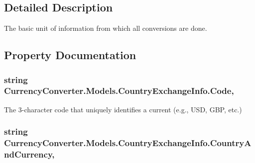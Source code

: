 \subsection{Detailed Description}
The basic unit of information from which all conversions are done. 



\subsection{Property Documentation}
\hypertarget{class_currency_converter_1_1_models_1_1_country_exchange_info_a07914fa16f09bfb0343b9008e96a7d33}{
\subsubsection[{Code}]{\setlength{\rightskip}{0pt plus 5cm}string Currency\-Converter.\-Models.\-Country\-Exchange\-Info.\-Code\hspace{0.3cm}{\ttfamily [get]}, {\ttfamily [set]}}}\label{class_currency_converter_1_1_models_1_1_country_exchange_info_a07914fa16f09bfb0343b9008e96a7d33}


The 3-\/character code that uniquely identifies a current (e.\-g., U\-S\-D, G\-B\-P, etc.) 

\hypertarget{class_currency_converter_1_1_models_1_1_country_exchange_info_a64106661335ca8646624e98a3d440978}{
\subsubsection[{Country\-And\-Currency}]{\setlength{\rightskip}{0pt plus 5cm}string Currency\-Converter.\-Models.\-Country\-Exchange\-Info.\-Country\-And\-Currency\hspace{0.3cm}{\ttfamily [get]}, {\ttfamily [set]}}}\label{class_currency_converter_1_1_models_1_1_country_exchange_info_a64106661335ca8646624e98a3d440978}


